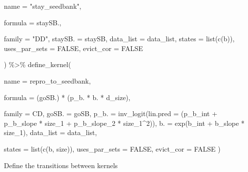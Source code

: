 \documentclass[
]{article}
\newenvironment{Shaded}{\begin{snugshade}}{\end{snugshade}}
\newcommand{\AttributeTok}[1]{\textcolor[rgb]{0.77,0.63,0.00}{#1}}
\newcommand{\ConstantTok}[1]{\textcolor[rgb]{0.00,0.00,0.00}{#1}}
\newcommand{\DecValTok}[1]{\textcolor[rgb]{0.00,0.00,0.81}{#1}}
\newcommand{\FunctionTok}[1]{\textcolor[rgb]{0.00,0.00,0.00}{#1}}
\newcommand{\NormalTok}[1]{#1}
\newcommand{\SpecialCharTok}[1]{\textcolor[rgb]{0.00,0.00,0.00}{#1}}
\newcommand{\StringTok}[1]{\textcolor[rgb]{0.31,0.60,0.02}{#1}}
\begin{document}
\begin{Shaded}
\begin{Highlighting}[]
    \AttributeTok{name    =} \StringTok{"stay\_seedbank"}\NormalTok{,}
   
    \AttributeTok{formula       =}\NormalTok{ staySB.,}
    
    \AttributeTok{family        =} \StringTok{"DD"}\NormalTok{,}
    \AttributeTok{staySB.        =}\NormalTok{ staySB,}
    \AttributeTok{data\_list     =}\NormalTok{ data\_list,}
    \AttributeTok{states        =} \FunctionTok{list}\NormalTok{(}\FunctionTok{c}\NormalTok{(}\StringTok{\textquotesingle{}b\textquotesingle{}}\NormalTok{)),}
    \AttributeTok{uses\_par\_sets =} \ConstantTok{FALSE}\NormalTok{,}
    \AttributeTok{evict\_cor =} \ConstantTok{FALSE}
    
\NormalTok{  ) }\SpecialCharTok{\%\textgreater{}\%}
  \FunctionTok{define\_kernel}\NormalTok{(}
    
    \AttributeTok{name          =} \StringTok{\textquotesingle{}repro\_to\_seedbank\textquotesingle{}}\NormalTok{,}
    
    \AttributeTok{formula       =}\NormalTok{ (goSB.) }\SpecialCharTok{*}\NormalTok{ (p\_b. }\SpecialCharTok{*}\NormalTok{ b. }\SpecialCharTok{*}\NormalTok{ d\_size),}
    
    \AttributeTok{family        =} \StringTok{\textquotesingle{}CD\textquotesingle{}}\NormalTok{,}
    \AttributeTok{goSB.          =}\NormalTok{ goSB, }
    \AttributeTok{p\_b.          =} \FunctionTok{inv\_logit}\NormalTok{(}\AttributeTok{lin.pred =}\NormalTok{ (p\_b\_int }\SpecialCharTok{+}\NormalTok{ p\_b\_slope }\SpecialCharTok{*}\NormalTok{ size\_1 }\SpecialCharTok{+}\NormalTok{ p\_b\_slope\_2 }\SpecialCharTok{*}\NormalTok{ size\_1}\SpecialCharTok{\^{}}\DecValTok{2}\NormalTok{)),}
    \AttributeTok{b.            =} \FunctionTok{exp}\NormalTok{(b\_int }\SpecialCharTok{+}\NormalTok{ b\_slope }\SpecialCharTok{*}\NormalTok{ size\_1),}
    \AttributeTok{data\_list     =}\NormalTok{ data\_list,}
    
    \AttributeTok{states        =} \FunctionTok{list}\NormalTok{(}\FunctionTok{c}\NormalTok{(}\StringTok{\textquotesingle{}b\textquotesingle{}}\NormalTok{, }\StringTok{\textquotesingle{}size\textquotesingle{}}\NormalTok{)),}
    \AttributeTok{uses\_par\_sets =} \ConstantTok{FALSE}\NormalTok{,}
    \AttributeTok{evict\_cor =} \ConstantTok{FALSE}
\NormalTok{) }
\end{Highlighting}
\end{Shaded}

Define the transitions between kernels
\end{document}
